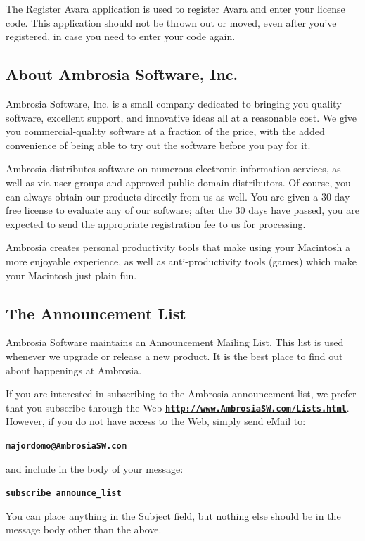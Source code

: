 \documentclass{article}
\begin{document}
The Register Avara application is used to register Avara and enter your license code. This application should not be thrown out or moved, even after you've registered, in case you need to enter your code again.

\subsection{About Ambrosia Software, Inc.}
Ambrosia Software, Inc. is a small company dedicated to bringing you quality software, excellent support, and innovative ideas all at a reasonable cost. We give you commercial-quality software at a fraction of the price, with the added convenience of being able to try out the software before you pay for it.

Ambrosia distributes software on numerous electronic information services, as well as via user groups and approved public domain distributors. Of course, you can always obtain our products directly from us as well. You are given a 30 day free license to evaluate any of our software; after the 30 days have passed, you are expected to send the appropriate registration fee to us for processing.

Ambrosia creates personal productivity tools that make using your Macintosh a more enjoyable experience, as well as anti-productivity tools (games) which make your Macintosh just plain fun.

\subsection{The Announcement List}
Ambrosia Software maintains an Announcement Mailing List. This list is used whenever we upgrade or release a new product. It is the best place to find out about happenings at Ambrosia.

If you are interested in subscribing to the Ambrosia announcement list, we prefer that you subscribe through the Web \textbf{\href{https://web.archive.org/web/20060926193355/http://www.ambrosiasw.com:80/Lists.html}{\texttt{http://www.AmbrosiaSW.com/Lists.html}}}. However, if you do not have access to the Web, simply send eMail to:

\textbf{\texttt{majordomo@AmbrosiaSW.com}}

and include in the body of your message:

\textbf{\texttt{subscribe announce\_list}}

You can place anything in the Subject field, but nothing else should be in the message body other than the above.
\end{document}
